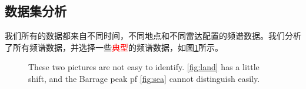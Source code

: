 \subsection{数据集分析}
我们所有的数据都来自不同时间，不同地点和不同雷达配置的频谱数据。我们分析了所有频谱数据，并选择一些\textcolor{red}{典型}的频谱数据，如图\ref{fig:spectrum}所示。
\begin{figure}[!t]
	\centering
	\hfil
	\caption{These two pictures are not easy to identify. \ref{fig:land} has a little shift, and the Barrage peak pf \ref{fig:sea} cannot distinguish easily.}
	\label{fig:spectrum}
\end{figure}

